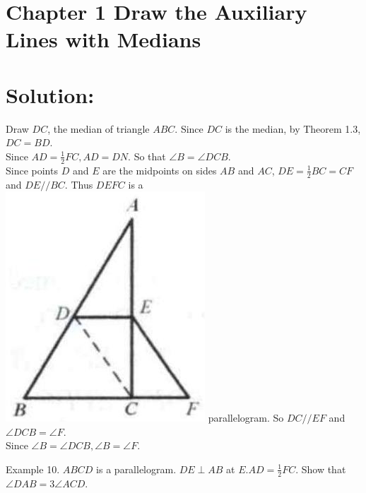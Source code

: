 \documentclass[10pt]{article}
\begin{document}
\section*{Chapter 1 Draw the Auxiliary Lines with Medians}
\section*{Solution:}
Draw \(D C\), the median of triangle \(A B C\). Since \(D C\) is the median, by Theorem 1.3, \(D C=B D\).\\
Since \(A D=\frac{1}{2} F C, A D=D N\). So that \(\angle B=\angle D C B\).\\
Since points \(D\) and \(E\) are the midpoints on sides \(A B\) and \(A C\), \(D E=\frac{1}{2} B C=C F\) and \(D E / / B C\). Thus \(D E F C\) is a\\
\includegraphics[max width=\textwidth]{2025_04_17_97bc1f7e44d93c271a88g-012} parallelogram. So \(D C / / E F\) and \(\angle D C B=\angle F\).\\
Since \(\angle B=\angle D C B, \angle B=\angle F\).

Example 10. \(A B C D\) is a parallelogram. \(D E \perp A B\) at \(E . A D=\frac{1}{2} F C\). Show that \(\angle D A B=3 \angle A C D\).
\end{document}
